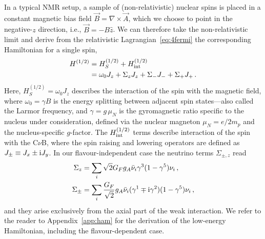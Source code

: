 \documentclass[aps,prd,10pt,twocolumn,superscriptaddress,floatfix,nofootinbib,amsmath,amssymb,altaffilletter,preprintnumbers]{revtex4-1}
\begin{document}
In a typical NMR setup, a sample of (non-relativistic) nuclear spins is placed in a constant magnetic bias field $\vec{B} = \nabla \times \vec{A}$, which we choose to point in the negative-$z$ direction, i.e., $\vec{B} = - B\hat{z}$. We can therefore take the non-relativistic limit and derive from the relativistic Lagrangian~\eqref{eq:4fermi} the corresponding Hamiltonian for a single spin,
\begin{equation}
\begin{aligned}
    H^{(1/2)}&=H_S^{(1/2)}+H_{\rm int}^{(1/2)} \\
    &=\omega_0J_z+\Sigma_zJ_z+\Sigma_-J_-+\Sigma_+J_+\, .
    \label{h1}
\end{aligned}
\end{equation}
Here, $H_S^{(1/2)} = \omega_0 J_z$ describes the interaction of the spin with the magnetic field, where $\omega_0=\gamma B$ is the energy splitting between adjacent spin states---also called the Larmor frequency, and $\gamma=g\, \mu_N$ is the gyromagnetic ratio specific to the nucleus under consideration, defined via the nuclear magneton $\mu_N=e/2m_p$ and the nucleus-specific $g$-factor. 
The $H_{\rm int}^{(1/2)}$ terms describe interaction of the spin with the C$\nu$B, where the spin raising and lowering operators are defined as $J_\pm \equiv J_x \pm {\rm i} J_y$. In our flavour-independent case the neutrino terms $\Sigma_{\pm,z}$ read 
\begin{equation}
\begin{aligned}
    \Sigma_z&=\sum_i \sqrt{2}G_Fg_A\bar{\nu}_i\gamma^3(1-\gamma^5)\nu_i\, ,\\
    \Sigma_\pm&= \sum_i \frac{G_F}{\sqrt{2}}g_A\bar{\nu}_i(\gamma^1\mp {\rm i}\gamma^2)(1-\gamma^5)\nu_i\, ,
    \label{eq:nuterms}
\end{aligned}
\end{equation}
and they arise exclusively from the axial part of the weak interaction. We refer to the reader to Appendix~\ref{app:ham} for the derivation of the low-energy Hamiltonian, including the flavour-dependent case.
\end{document}

